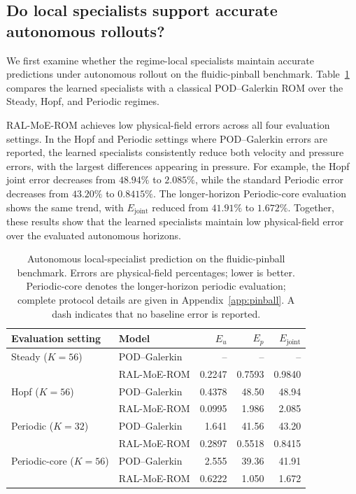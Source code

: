 \documentclass{article}
\begin{document}
\par



\subsection{Do local specialists support accurate autonomous rollouts?}

We first examine whether the regime-local specialists maintain accurate predictions under autonomous rollout on the fluidic-pinball benchmark. Table~\ref{tab:pinball_autonomous} compares the learned specialists with a classical POD--Galerkin ROM over the Steady, Hopf, and Periodic regimes.

RAL-MoE-ROM achieves low physical-field errors across all four evaluation settings. In the Hopf and Periodic settings where POD--Galerkin errors are reported, the learned specialists consistently reduce both velocity and pressure
errors, with the largest differences appearing in pressure. For example, the Hopf joint error decreases from $48.94\%$ to $2.085\%$, while the standard Periodic error decreases from $43.20\%$ to $0.8415\%$. The longer-horizon Periodic-core evaluation shows the same trend, with $E_{\mathrm{joint}}$ reduced from $41.91\%$ to $1.672\%$. Together, these results show that the learned specialists maintain low physical-field error over the evaluated autonomous horizons.

\par


\begin{table}[H]
\centering
\caption{
Autonomous local-specialist prediction on the fluidic-pinball benchmark. Errors are physical-field percentages; lower is better. Periodic-core denotes the longer-horizon periodic evaluation; complete protocol details are given in Appendix~\ref{app:pinball}. A dash indicates that no baseline error is reported.
}
\label{tab:pinball_autonomous}
\small
\setlength{\tabcolsep}{5pt}
\begin{tabular}{@{}llrrr@{}}
\toprule
Evaluation setting & Model & $E_u$ & $E_p$ & $E_{\mathrm{joint}}$ \\
\midrule
Steady ($K=56$)
& POD--Galerkin
& -- & -- & -- \\
& RAL-MoE-ROM
& 0.2247 & 0.7593 & 0.9840 \\
\addlinespace

Hopf ($K=56$)
& POD--Galerkin
& 0.4378 & 48.50 & 48.94 \\
& RAL-MoE-ROM
& 0.0995 & 1.986 & 2.085 \\
\addlinespace

Periodic ($K=32$)
& POD--Galerkin
& 1.641 & 41.56 & 43.20 \\
& RAL-MoE-ROM
& 0.2897 & 0.5518 & 0.8415 \\
\addlinespace

Periodic-core ($K=56$)
& POD--Galerkin
& 2.555 & 39.36 & 41.91 \\
& RAL-MoE-ROM
& 0.6222 & 1.050 & 1.672 \\
\bottomrule
\end{tabular}
\end{table}
\end{document}

